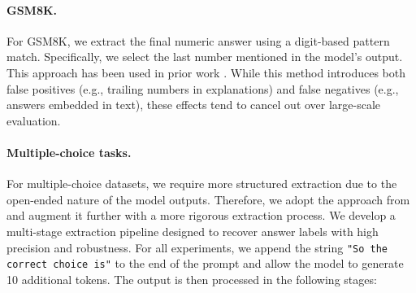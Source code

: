 \documentclass{article} %
\begin{document}
\paragraph{GSM8K.}
For GSM8K, we extract the final numeric answer using a digit-based pattern match. Specifically, we select the last number mentioned in the model's output. This approach has been used in prior work \citep{wang2023far, wang2402chain}. While this method introduces both false positives (e.g., trailing numbers in explanations) and false negatives (e.g., answers embedded in text), these effects tend to cancel out over large-scale evaluation.

\paragraph{Multiple-choice tasks.}
For multiple-choice datasets, we require more structured extraction due to the open-ended nature of the model outputs. Therefore, we adopt the approach from \citet{wang2402chain} and augment it further with a more rigorous extraction process. We develop a multi-stage extraction pipeline designed to recover answer labels with high precision and robustness. For all experiments, we append the string \texttt{"So the correct choice is"} to the end of the prompt and allow the model to generate 10 additional tokens. The output is then processed in the following stages:
\end{document}
